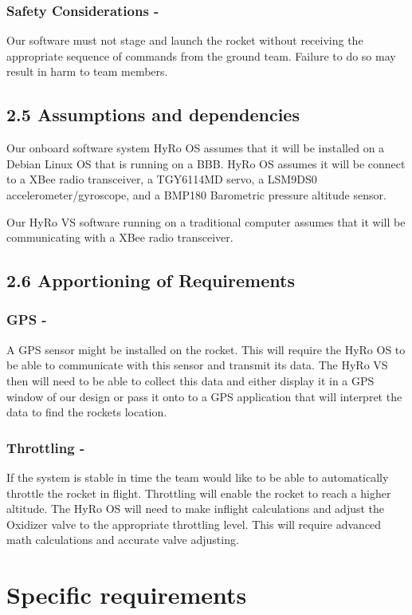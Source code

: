 \documentclass[10pt,draftclsnofoot,onecolumn]{IEEEtran}
\begin{document}
\subsubsection{Safety Considerations -} Our software must not stage and launch the rocket without receiving the appropriate sequence of commands from the ground team. Failure to do so may result in harm to team members.

\subsection{2.5 Assumptions and dependencies}
Our onboard software system HyRo OS assumes that it will be installed on a Debian Linux OS that is running on a BBB.  HyRo OS assumes it will be connect to a XBee radio transceiver, a TGY6114MD servo, a LSM9DS0 accelerometer/gyroscope, and a BMP180 Barometric pressure altitude sensor.\par
	Our HyRo VS software running on a traditional computer assumes that it will be communicating with a XBee radio transceiver.

\subsection{2.6 Apportioning of Requirements}
\subsubsection{GPS -} A GPS sensor might be installed on the rocket. This will require the HyRo OS to be able to communicate with this sensor and transmit its data. The HyRo VS then will need to be able to collect this data and either display it in a GPS window of our design or pass it onto to a GPS application that will interpret the data to find the rockets location.
\subsubsection{Throttling -} If the system is stable in time the team would like to be able to automatically throttle the rocket in flight. Throttling will enable the rocket to reach a higher altitude. The HyRo OS will need to make inflight calculations and adjust the Oxidizer valve to the appropriate throttling level. This will require advanced math calculations and accurate valve adjusting.

\section{ Specific requirements}
\end{document}
